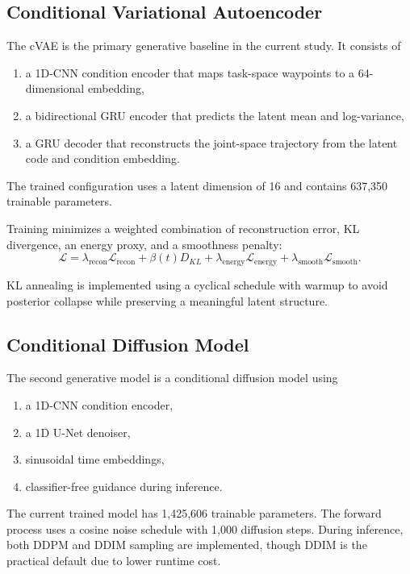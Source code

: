\documentclass[11pt]{article}
\begin{document}
\subsection{Conditional Variational Autoencoder}

The cVAE is the primary generative baseline in the current study. It consists of
\begin{enumerate}[leftmargin=1.5em]
    \item a 1D-CNN condition encoder that maps task-space waypoints to a 64-dimensional embedding,
    \item a bidirectional GRU encoder that predicts the latent mean and log-variance,
    \item a GRU decoder that reconstructs the joint-space trajectory from the latent code and condition embedding.
\end{enumerate}

The trained configuration uses a latent dimension of 16 and contains 637,350 trainable parameters.

Training minimizes a weighted combination of reconstruction error, KL divergence, an energy proxy, and a smoothness penalty:
\begin{equation}
    \mathcal{L} =
    \lambda_{\text{recon}}\mathcal{L}_{\text{recon}}
    + \beta(t)D_{KL}
    + \lambda_{\text{energy}}\mathcal{L}_{\text{energy}}
    + \lambda_{\text{smooth}}\mathcal{L}_{\text{smooth}}.
\end{equation}

KL annealing is implemented using a cyclical schedule with warmup to avoid posterior collapse while preserving a meaningful latent structure.

\subsection{Conditional Diffusion Model}

The second generative model is a conditional diffusion model using
\begin{enumerate}[leftmargin=1.5em]
    \item a 1D-CNN condition encoder,
    \item a 1D U-Net denoiser,
    \item sinusoidal time embeddings,
    \item classifier-free guidance during inference.
\end{enumerate}

The current trained model has 1,425,606 trainable parameters. The forward process uses a cosine noise schedule with 1,000 diffusion steps. During inference, both DDPM and DDIM sampling are implemented, though DDIM is the practical default due to lower runtime cost.
\end{document}
